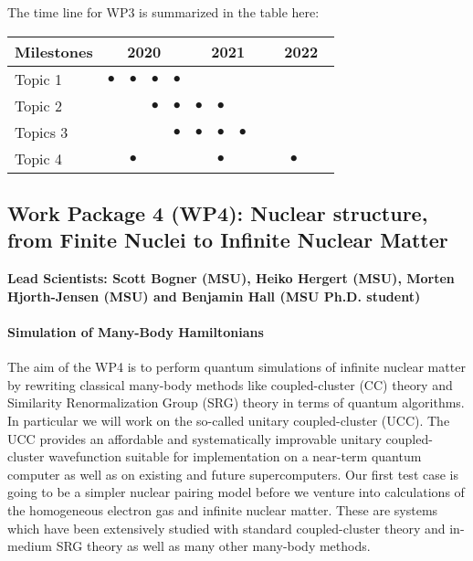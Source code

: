 \documentclass[10pt]{article}
\begin{document}
The time line for WP3 is summarized in the table here:
\begin{footnotesize}
\begin{center}
\begin{tabular}{|l|c|c|c|c|c|c|c|c|c|c|c|c|}
\hline
\multicolumn{1}{|l}{Milestones } & \multicolumn{4}{|c|}{ 2020 } & \multicolumn{4}{c|}{ 2021 } & \multicolumn{4}{c|}{ 2022 } \\
\hline
Topic 1 &$\bullet$ &$\bullet$ &$\bullet$ &$\bullet$ & & & & & & & &  \\
\hline
Topic 2 & & &$\bullet$ &$\bullet$ &$\bullet$ &$\bullet$ & & & & & &  \\
\hline
Topics 3 & & & & $\bullet$ &$\bullet$ &$\bullet$ &$\bullet$ & & & & &  \\
\hline
Topic 4 & &$\bullet$ & & & &$\bullet$ & & & &$\bullet$ & &  \\
\hline

\end{tabular}
\end{center}
\end{footnotesize}





\subsection{Work Package 4 (WP4): Nuclear structure, from Finite Nuclei to Infinite Nuclear Matter}
{\bf Lead Scientists: Scott Bogner (MSU), Heiko Hergert (MSU), Morten Hjorth-Jensen (MSU) and Benjamin Hall (MSU Ph.D. student)}
\paragraph{Simulation of Many-Body Hamiltonians}

The aim of the WP4 is to perform quantum simulations of infinite nuclear matter by rewriting classical many-body methods like coupled-cluster (CC) theory and Similarity Renormalization Group (SRG) theory in terms of quantum algorithms. In particular we will work on  the so-called unitary coupled-cluster (UCC). The UCC provides an affordable and systematically improvable unitary coupled-cluster wavefunction suitable for implementation on a near-term quantum computer as well as on existing and future supercomputers. Our first test case is going to be a simpler nuclear pairing model before we venture into calculations of the homogeneous electron gas and infinite nuclear matter. These are systems which have been extensively studied with standard coupled-cluster theory and in-medium SRG theory as well as many other many-body methods.  
\end{document}
